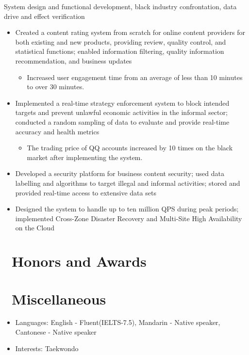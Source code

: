 \documentclass{resume}
\begin{document}
\begin{onehalfspacing}
    System design and functional development, black industry confrontation, data drive and effect verification
\end{onehalfspacing}
\begin{itemize}
  \item Created a content rating system from scratch for online content providers for both existing and new products, providing review, quality control, and statistical functions; enabled information filtering, quality information recommendation, and business updates
  \begin{itemize}
      \item Increased user engagement time from an average of less than 10 minutes to over 30 minutes.
  \end{itemize}
  \item Implemented a real-time strategy enforcement system to block intended targets and prevent unlawful economic activities in the informal sector; conducted a random sampling of data to evaluate and provide real-time accuracy and health metrics
  \begin{itemize}
      \item The trading price of QQ accounts increased by 10 times on the black market after implementing the system.
  \end{itemize}
  \item Developed a security platform for business content security; used data labelling and algorithms to target illegal and informal activities; stored and provided real-time access to extensive data sets
  \item Designed the system to handle up to ten million QPS during peak periods; implemented Cross-Zone Disaster
Recovery and Multi-Site High Availability on the Cloud
\end{itemize}



\section{\faHeartO\ Honors and Awards}

\section{\faInfo\ Miscellaneous}
\begin{itemize}[parsep=0.5ex]
  \item Languages: English - Fluent(IELTS-7.5), Mandarin - Native speaker, Cantonese - Native speaker
  \item Interests: Taekwondo
\end{itemize}

%
%
\end{document}
